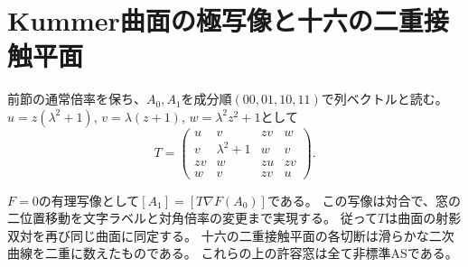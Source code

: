 \section{Kummer曲面の極写像と十六の二重接触平面}
\label{sec:kummer-polar-completion}
前節の通常倍率を保ち、$A_0,A_1$を成分順$(00,01,10,11)$で列ベクトルと読む。
$u=z(\lambda^2+1)$, $v=\lambda(z+1)$, $w=\lambda^2z^2+1$として
\[
 T=\begin{pmatrix}
 u&v&zv&w\\v&\lambda^2+1&w&v\\zv&w&zu&zv\\w&v&zv&u
 \end{pmatrix}.
\]
\begin{theorem}\label{thm:kummer-polar-completion}
$F=0$の有理写像として$[A_1]=[T\nabla F(A_0)]$である。
この写像は対合で、窓の二位置移動を文字ラベルと対角倍率の変更まで実現する。
従って$T$は曲面の射影双対を再び同じ曲面に同定する。
十六の二重接触平面の各切断は滑らかな二次曲線を二重に数えたものである。
これらの上の許容窓は全て非標準ASである。
\end{theorem}
